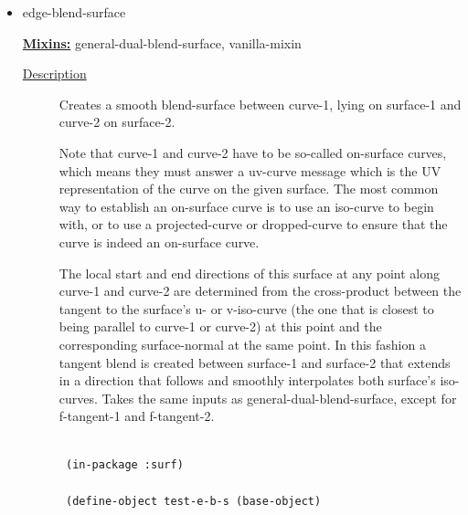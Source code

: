 \documentclass [11pt]{book}
\begin{document}
\begin{itemize}
\begin{description}
\end{description}







\item {}edge-blend-surface


\textbf{
\underline{Mixins:}} general-dual-blend-surface, vanilla-mixin





\begin{description}

\item [
\underline{Description}]


Creates a smooth blend-surface between curve-1, lying on surface-1 and curve-2 on surface-2. 

Note that curve-1 and curve-2 have to be so-called on-surface curves, which means they must answer a uv-curve message which is the UV representation of the curve on the given surface. The most common way to establish an on-surface curve is to use an iso-curve to begin with, or to use a projected-curve or dropped-curve to ensure that the curve is indeed an on-surface curve.

The local start and end directions of this surface at any point along curve-1 and curve-2 are determined from the cross-product between the tangent to the surface's u- or v-iso-curve (the one that is closest to being parallel to curve-1 or curve-2) at this point and the corresponding surface-normal at the same point. In this fashion a tangent blend is created between surface-1 and surface-2 that extends in a direction that follows and smoothly interpolates both surface's iso-curves. Takes the same inputs as general-dual-blend-surface, except for f-tangent-1 and f-tangent-2.



\end{description}




\begin{figure}
\begin{lrbox}{\boxedverb}
\begin{minipage}{\linewidth}
{\small

\begin{verbatim}

 (in-package :surf)

 (define-object test-e-b-s (base-object)
  

\end{verbatim}}
\end{minipage}
\end{lrbox}
\end{figure}
\end{itemize}
\end{document}
